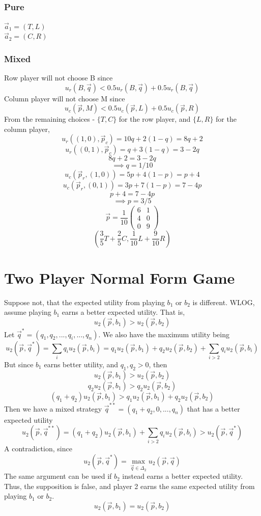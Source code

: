\subsection{}
\subsubsection{Pure}
$\vec{a}_1=(T,L)$\\
$\vec{a}_2=(C,R)$
\subsubsection{Mixed}
Row player will not choose B since 
\[u_r(B,\vec{q})<0.5u_r(B,\vec{q})+0.5u_r(B,\vec{q})\]
Column player will not choose M since
\[u_c(\vec{p},M)<0.5u_c(\vec{p},L)+0.5u_c(\vec{p},R)\]
From the remaining choices - $\{T,C\}$ for the row player,
and $\{L,R\}$ for the column player,
\[u_r((1,0),\vec{p}_c)=10q+2(1-q)=8q+2\]
\[u_r((0,1),\vec{p}_c)=q+3(1-q)=3-2q\]
\[8q+2=3-2q\]
\[\implies q=1/10\]
\[u_c(\vec{p}_r,(1,0))=5p+4(1-p)=p+4\]
\[u_c(\vec{p}_r,(0,1))=3p+7(1-p)=7-4p\]
\[p+4=7-4p\]
\[\implies p=3/5\]
\[\vec{p}=\frac{1}{10}
\begin{pmatrix}
    6 & 1\\
    4 & 0\\
    0 & 9
\end{pmatrix}\]
\[\left(\frac{3}{5}T+\frac{2}{5}C,\frac{1}{10}L+\frac{9}{10}R\right)\]

\newpage
\section{Two Player Normal Form Game}
Suppose not, that the expected utility from playing $b_1$ or $b_2$ is different.
WLOG, assume playing $b_1$ earns a better expected utility. That is,
\[u_2(\vec{p},b_1) > u_2(\vec{p},b_2)\]
Let $\vec{q}^* = (q_1,q_2,...,q_i,...,q_n)$.
We also have the maximum utility being
\[u_2(\vec{p},\vec{q}^*)=\sum_i q_i u_2(\vec{p},b_i)
=q_1 u_2(\vec{p},b_1) + q_2 u_2(\vec{p},b_2)
+ \sum_{i>2} q_i u_2(\vec{p},b_i)\]
But since $b_1$ earns better utility, and $q_1,q_2>0$, then
\[u_2(\vec{p},b_1) > u_2(\vec{p},b_2)\]
\[q_2 u_2(\vec{p},b_1) > q_2 u_2(\vec{p},b_2)\]
\[(q_1 + q_2) u_2(\vec{p},b_1) > 
q_1 u_2(\vec{p},b_1) + q_2 u_2(\vec{p},b_2)\]
Then we have a mixed strategy $\vec{q}^{**}=(q_1 + q_2,0,..., q_n)$
that has a better expected utility
\[ u_2(\vec{p},\vec{q}^{**})
=(q_1 + q_2) u_2(\vec{p},b_1) + \sum_{i>2} q_i u_2(\vec{p},b_i)
> u_2(\vec{p},\vec{q}^*)\]
A contradiction, since
\[u_2(\vec{p},\vec{q}^*) = \max_{\vec{q}\in\Delta_2}u_2(\vec{p},\vec{q})\]
The same argument can be used if $b_2$ instead earns a better expected utility.
Thus, the supposition is false, and player 2 earns the same expected utility
from playing $b_1$ or $b_2$.
\[u_2(\vec{p},b_1) = u_2(\vec{p},b_2)\]

